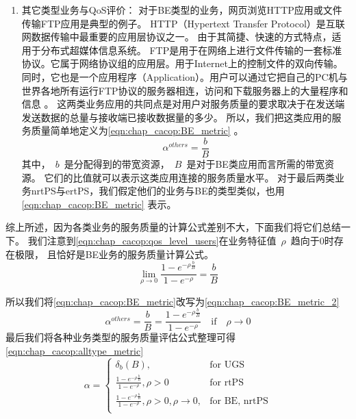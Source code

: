 \begin{enumerate}[(1)]
\item 其它类型业务与QoS评价：
对于BE类型的业务，网页浏览HTTP应用或文件传输FTP应用是典型的例子。
HTTP（Hypertext Transfer Protocol）是互联网数据传输中最重要的应用层协议之一\cite{Fielding_1999}。 
由于其简捷、快速的方式特点，适用于分布式超媒体信息系统。
FTP是用于在网络上进行文件传输的一套标准协议。它属于网络协议组的应用层。用于Internet上的控制文件的双向传输。
同时，它也是一个应用程序（Application）。用户可以通过它把自己的PC机与世界各地所有运行FTP协议的服务器相连，访问和下载服务器上的大量程序和信息 \cite{Postel_Reynolds_1985}。
这两类业务应用的共同点是对用户对服务质量的要求取决于在发送端发送数据的总量与接收端已接收数据量的多少。
所以，我们把这类应用的服务质量简单地定义为\eqref{eqn:chap_cacop:BE_metric} 。
%
\begin{equation}
\label{eqn:chap_cacop:BE_metric}
\alpha^{others} = \frac{b}{B}
\end{equation}
%
其中，~$b$~是分配得到的带宽资源，~$B$~是对于BE类应用而言所需的带宽资源。
它们的比值就可以表示这类应用连接的服务质量水平。
对于最后两类业务nrtPS与ertPS，我们假定他们的业务与BE的类型类似，也用 \eqref{eqn:chap_cacop:BE_metric} 表示。
\end{enumerate}

综上所述，因为各类业务的服务质量的计算公式差别不大，下面我们将它们总结一下。
我们注意到\eqref{eqn:chap_cacop:qos_level_users}在业务特征值~$\rho$~趋向于$0$时存在极限，
且恰好是BE业务的服务质量计算公式。
%
\begin{equation}
\label{eqn:BE_limit}
\lim\limits_{\rho \to 0 } \frac{1- e^{-\rho \frac{b}{B} }}{1-e^{-\rho}} = \frac{b}{B}
\end{equation}

所以我们将\eqref{eqn:chap_cacop:BE_metric}改写为\eqref{eqn:chap_cacop:BE_metric_2}
%
\begin{equation}
\label{eqn:chap_cacop:BE_metric_2}
\alpha^{others} = \frac{b}{B} = \frac{1- e^{-\rho \frac{b}{B} }}{1-e^{-\rho}} \quad \text{if} \quad \rho \to 0
\end{equation}
%
最后我们将各种业务类型的服务质量评估公式整理可得\eqref{eqn:chap_cacop:alltype_metric}
%
\begin{equation}
\alpha = 
\begin{cases}
\delta_{b}(B), &\text{for UGS} \\
\frac{1- e^{-\rho \frac{b}{B} }}{1-e^{-\rho}}, \rho > 0& \text{for rtPS }\\
\frac{1- e^{-\rho \frac{b}{B} }}{1-e^{-\rho}}, \rho>0, \rho \to 0, &\text{for BE, nrtPS}\\
\end{cases}
\label{eqn:chap_cacop:alltype_metric}
\end{equation}
